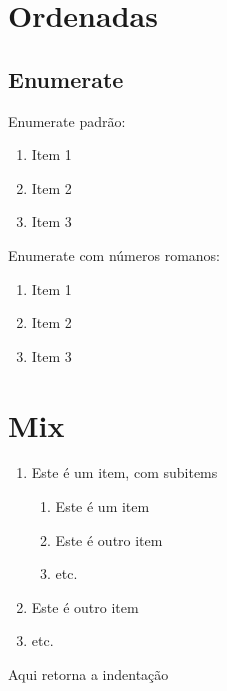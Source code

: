 \documentclass{report}
\begin{document}
        \chapter{Ordenadas}\label{chap:ordenadas}
            \section{Enumerate}\label{sec:enumerate}
                Enumerate padrão:
                \begin{enumerate}\label{lista-enumerate-exemplo}
                    \item Item 1
                    \item Item 2
                    \item Item 3
                \end{enumerate}
                Enumerate com números romanos:
                \renewcommand{\theenumi}{\Roman{enumi}}
                \begin{enumerate}\label{lista-enumerate-exemplo-interna}
                    \item Item 1
                    \item Item 2
                    \item Item 3
                \end{enumerate}
    
        \chapter{Mix}\label{chap:mix}
            \renewcommand{\theenumi}{\Roman{enumi}}
            \begin{enumerate}\label{lista-enumerate-mix}
                \item Este é um item, com subitems
                    \renewcommand{\theenumi}{\alpha{enumi}}
                    \begin{enumerate}\label{lista-enumerate-mix-interna}
                        \item Este é um item
                        \item Este é outro item
                        \item etc.
                    \end{enumerate}
                \renewcommand{\theenumi}{\Roman{enumi}}
                \item Este é outro item
                \item etc.
            \end{enumerate}
            Aqui retorna a indentação
    
\end{document}
